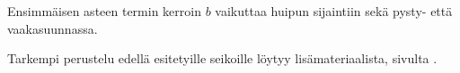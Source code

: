 %	

\begin{center}
\end{center}

Ensimmäisen asteen termin kerroin $b$ vaikuttaa huipun sijaintiin sekä pysty- että vaakasuunnassa.

\begin{center}
\end{center}

Tarkempi perustelu edellä esitetyille seikoille löytyy lisämateriaalista, sivulta \pageref{paraabeli_tod}.


%	
%
